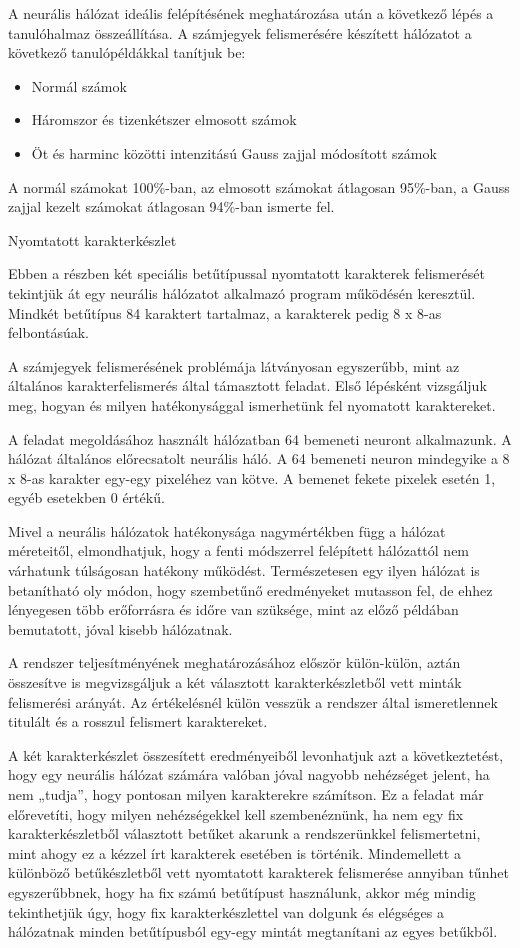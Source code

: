 A neurális hálózat ideális felépítésének meghatározása után a következő lépés a tanulóhalmaz összeállítása. A számjegyek felismerésére készített hálózatot a következő tanulópéldákkal tanítjuk be: 

\begin{itemize}
\item Normál számok 
\item Háromszor és tizenkétszer elmosott számok 
\item Öt és harminc közötti intenzitású Gauss zajjal módosított számok
\end{itemize}

A normál számokat 100\%-ban, az elmosott számokat átlagosan 95\%-ban, a Gauss zajjal kezelt számokat átlagosan 94\%-ban ismerte fel.

Nyomtatott karakterkészlet

Ebben a részben két speciális betűtípussal nyomtatott karakterek felismerését tekintjük át egy neurális hálózatot alkalmazó program működésén keresztül. Mindkét betűtípus 84 karaktert tartalmaz, a karakterek pedig 8 x 8-as felbontásúak.

A számjegyek felismerésének problémája látványosan egyszerűbb, mint az általános karakterfelismerés által támasztott feladat. Első lépésként vizsgáljuk meg, hogyan és milyen hatékonysággal ismerhetünk fel nyomatott karaktereket.

A feladat megoldásához használt hálózatban 64 bemeneti neuront alkalmazunk. A hálózat általános előrecsatolt neurális háló. A 64 bemeneti neuron mindegyike a 8 x 8-as karakter egy-egy pixeléhez van kötve. A bemenet fekete pixelek esetén 1, egyéb esetekben 0 értékű.

Mivel a neurális hálózatok hatékonysága nagymértékben függ a hálózat méreteitől, elmondhatjuk, hogy a fenti módszerrel felépített hálózattól nem várhatunk túlságosan hatékony működést. Természetesen egy ilyen hálózat is betanítható oly módon, hogy szembetűnő eredményeket mutasson fel, de ehhez lényegesen több erőforrásra és időre van szüksége, mint az előző példában bemutatott, jóval kisebb hálózatnak.

A rendszer teljesítményének meghatározásához először külön-külön, aztán összesítve is megvizsgáljuk a két választott karakterkészletből vett minták felismerési arányát. Az értékelésnél külön vesszük a rendszer által ismeretlennek titulált és a rosszul felismert karaktereket.

A két karakterkészlet összesített eredményeiből levonhatjuk azt a következtetést, hogy egy neurális hálózat számára valóban jóval nagyobb nehézséget jelent, ha nem „tudja”, hogy pontosan milyen karakterekre számítson. Ez a feladat már előrevetíti, hogy milyen nehézségekkel kell szembenéznünk, ha nem egy fix karakterkészletből választott betűket akarunk a rendszerünkkel felismertetni, mint ahogy ez a kézzel írt karakterek esetében is történik. Mindemellett a különböző betűkészletből vett nyomtatott karakterek felismerése annyiban tűnhet egyszerűbbnek, hogy ha fix számú betűtípust használunk, akkor még mindig tekinthetjük úgy, hogy fix karakterkészlettel van dolgunk és elégséges a hálózatnak minden betűtípusból egy-egy mintát megtanítani az egyes betűkből.

